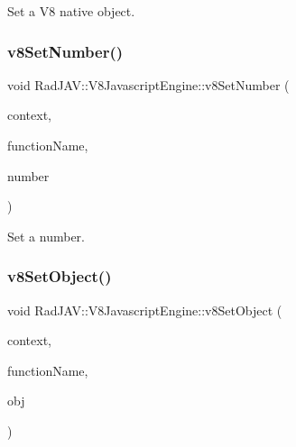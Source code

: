 Set a V8 native object. 

\mbox{\label{class_rad_j_a_v_1_1_v8_javascript_engine_a05a3133ff9eba6aebe30e0678a2d8f41}} 
\subsubsection{\texorpdfstring{v8\+Set\+Number()}{v8SetNumber()}}
{\footnotesize\ttfamily void Rad\+J\+A\+V\+::\+V8\+Javascript\+Engine\+::v8\+Set\+Number (\begin{DoxyParamCaption}\item[{v8\+::\+Local$<$ v8\+::\+Object $>$}]{context,  }\item[{\mbox{\hyperlink{class_rad_j_a_v_1_1_string}{String}}}]{function\+Name,  }\item[{R\+D\+E\+C\+I\+M\+AL}]{number }\end{DoxyParamCaption})}



Set a number. 

\mbox{\label{class_rad_j_a_v_1_1_v8_javascript_engine_af8bcd13608787e3d2eef9287c2b27b40}} 
\subsubsection{\texorpdfstring{v8\+Set\+Object()}{v8SetObject()}}
{\footnotesize\ttfamily void Rad\+J\+A\+V\+::\+V8\+Javascript\+Engine\+::v8\+Set\+Object (\begin{DoxyParamCaption}\item[{v8\+::\+Local$<$ v8\+::\+Object $>$}]{context,  }\item[{\mbox{\hyperlink{class_rad_j_a_v_1_1_string}{String}}}]{function\+Name,  }\item[{v8\+::\+Handle$<$ v8\+::\+Object $>$}]{obj }\end{DoxyParamCaption})}



